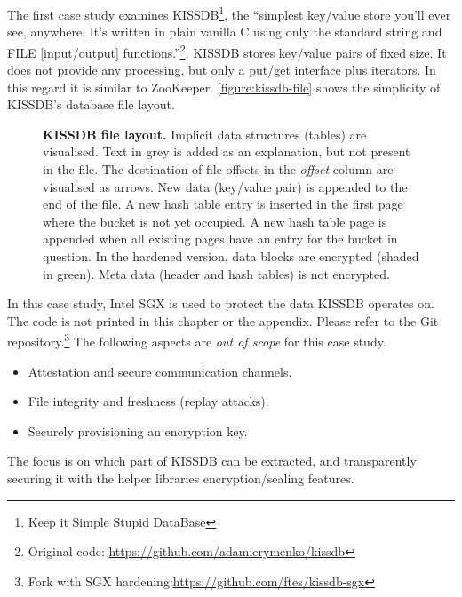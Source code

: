 The first case study examines KISSDB\footnote{Keep it Simple Stupid DataBase}, the ``simplest key/value store you'll ever see, anywhere. It's written in plain vanilla C using only the standard string and FILE [input/output] functions.''\footnote{Original code: \url{https://github.com/adamierymenko/kissdb}}.\label{ID_1142678733}
KISSDB stores key/value pairs of fixed size. It does not provide any processing, but only a put/get interface plus iterators. In this regard it is similar to ZooKeeper. \autoref{figure:kissdb-file} shows the simplicity of KISSDB's database file layout.\label{ID_1445380866}
\begin{figure}[htbp]
\makebox[\textwidth][c]{
}\caption{\textbf{KISSDB file layout.}\label{ID_1080934208}
Implicit data structures (tables) are visualised.\label{ID_1884080289}
Text in grey is added as an explanation, but not present in the file.\label{ID_899549956}
The destination of file offsets in the \textit{offset} column are visualised as arrows.\label{ID_889407334}
New data (key/value pair) is appended to the end of the file.\label{ID_624727598}
A new hash table entry is inserted in the first page where the bucket is not yet occupied.\label{ID_835587131}
A new hash table page is appended when all existing pages have an entry for the bucket in question.\label{ID_1038767895}
In the hardened version, data blocks are encrypted (shaded in green).\label{ID_282820875}
Meta data (header and hash tables) is not encrypted.\label{ID_1899010827}
\label{ID_498106613}\label{figure:kissdb-file}}
\end{figure}


In this case study, Intel SGX is used to protect the data KISSDB operates on.\label{ID_928802586}
The code is not printed in this chapter or the appendix. Please refer to the Git repository.\footnote{Fork with SGX hardening:\url{https://github.com/ftes/kissdb-sgx}}\label{ID_1138361928}
The following aspects are \textit{out of scope} for this case study.\label{ID_12313881}
\begin{itemize}\label{ID_1885741611}
\item Attestation and secure communication channels.\label{ID_1642397570}
\item File integrity and freshness (replay attacks).\label{ID_1066501065}
\item Securely provisioning an encryption key.\label{ID_390697218}
\end{itemize}\label{ID_1334182780}
The focus is on which part of KISSDB can be extracted, and transparently securing it with the helper libraries encryption/sealing features.\label{ID_80110359}

